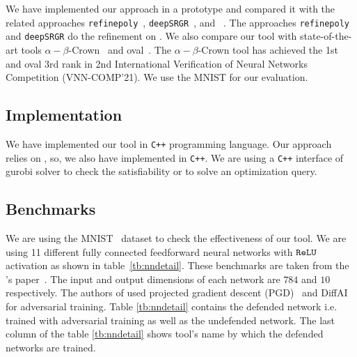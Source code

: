 We have implemented our approach in a prototype and compared it with the related 
approaches \texttt{refinepoly}~\cite{singh2019beyond}, \texttt{deepSRGR}~\cite{yang2021improving}, and \deeppoly{}~\cite{singh2019abstract}. 
The approaches  \texttt{refinepoly} and \texttt{deepSRGR} do the refinement on \deeppoly{}. We also compare 
our tool with state-of-the-art tools $\alpha - \beta$-Crown~\cite{alphabetacrown} and oval~\cite{ovaltool}. 
The $\alpha - \beta$-Crown tool has achieved the 1st and oval 3rd rank in
2nd International Verification of Neural Networks Competition (VNN-COMP'21). 
We use the MNIST \cite{deng2012mnist} for our evaluation.    
\subsection{Implementation}
We have implemented our tool in \texttt{C++} programming language. Our approach relies on \deeppoly{}, so, 
we also have implemented \deeppoly{} in \texttt{C++}. We are using a \texttt{C++} interface of gurobi solver 
to check the satisfiability or to solve an optimization query. 

\subsection{Benchmarks}
We are using the MNIST~\cite{deng2012mnist} dataset to check the effectiveness of our tool. 
We are using 11 different fully connected feedforward neural networks with $\mathtt{ReLU}${} activation as shown in table~\ref{tb:nndetail}.
These benchmarks are taken from the \deeppoly{}'s paper~\cite{singh2019abstract}. 
The input and output dimensions of each network are $784$ and $10$ respectively. 
The authors of \deeppoly{} used projected gradient descent (PGD)~\cite{dong2018boosting}
and DiffAI~\cite{mirman2018differentiable} for adversarial training. Table \ref{tb:nndetail} contains the defended network i.e.
trained with adversarial training as well as the undefended network. The last column of the table \ref{tb:nndetail}
shows tool's name by which the defended networks are trained.  

